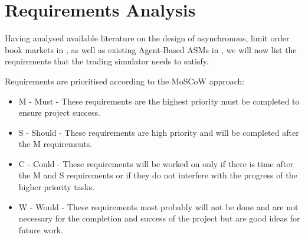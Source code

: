 \section{Requirements Analysis}
Having analysed available literature on the design of asynchronous, limit order book markets in , as well as existing Agent-Based ASMs in , we will now list the requirements that the trading simulator needs to satisfy.

Requirements are prioritised according to the MoSCoW approach:

\begin{itemize}
\item M - Must - These requirements are the highest priority must be completed to ensure project success.
\item S - Should - These requirements are high priority and will be completed after the M requirements.
\item C - Could - These requirements will be worked on only if there is time after the M and S requirements or if they do not interfere with the progress of the higher priority tasks.
\item W - Would - These requirements most probably will not be done and are not necessary for the completion and success of the project but are good ideas for future work.
\end{itemize}

